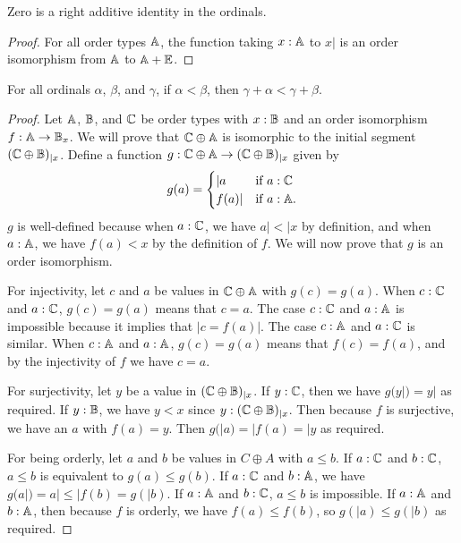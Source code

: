 \documentclass[../../math.tex]{subfiles}
\begin{document}
\begin{instance}
    Zero is a right additive identity in the ordinals.
\end{instance}
\begin{proof}
    For all order types $\mathbb{A}$, the function taking $x : \mathbb{A}$ to $x|$ is an order
    isomorphism from $\mathbb{A}$ to $\mathbb{A} + \mathbb{E}$.
\end{proof}

\begin{theorem} \label{ord_lt_lplus}
    For all ordinals $\alpha$, $\beta$, and $\gamma$, if $\alpha < \beta$, then
    $\gamma + \alpha < \gamma + \beta$.
\end{theorem}
\begin{proof}
    Let $\mathbb{A}$, $\mathbb{B}$, and $\mathbb{C}$ be order types with $x : \mathbb{B}$ and an order
    isomorphism $f : \mathbb{A} \to \mathbb{B}_x$.  We will prove that $\mathbb{C} \oplus \mathbb{A}$ is
    isomorphic to the initial segment $(\mathbb{C} \oplus \mathbb{B})_{|x}$.  Define a function
    $g : \mathbb{C} \oplus \mathbb{A} \to (\mathbb{C} \oplus \mathbb{B})_{|x}$ given by
    \[
        g(a) =
        \begin{cases}
            |a    &\text{if $a : \mathbb{C}$} \\
            f(a)| &\text{if $a : \mathbb{A}$.}
        \end{cases}
    \]
    $g$ is well-defined because when $a : \mathbb{C}$, we have $a| < |x$ by
    definition, and when $a : \mathbb{A}$, we have $f(a) < x$ by the definition of
    $f$.  We will now prove that $g$ is an order isomorphism.

    For injectivity, let $c$ and $a$ be values in $\mathbb{C} \oplus \mathbb{A}$ with $g(c) =
    g(a)$.  When $c : \mathbb{C}$ and $a : \mathbb{C}$, $g(c) = g(a)$ means that $c = a$.  The
    case $c : \mathbb{C}$ and $a : \mathbb{A}$ is impossible because it implies that $|c =
    f(a)|$.  The case $c : \mathbb{A}$ and $a : \mathbb{C}$ is similar.  When $c : \mathbb{A}$ and $a :
    \mathbb{A}$, $g(c) = g(a)$ means that $f(c) = f(a)$, and by the injectivity of $f$
    we have $c = a$.

    For surjectivity, let $y$ be a value in $(\mathbb{C} \oplus \mathbb{B})_{|x}$.  If $y : \mathbb{C}$,
    then we have $g(y|) = y|$ as required.  If $y : \mathbb{B}$, we have $y < x$ since
    $y : (\mathbb{C} \oplus \mathbb{B})_{|x}$.  Then because $f$ is surjective, we have an $a$
    with $f(a) = y$.  Then $g(|a) = |f(a) = |y$ as required.

    For being orderly, let $a$ and $b$ be values in $C \oplus A$ with $a \leq
    b$.  If $a : \mathbb{C}$ and $b : \mathbb{C}$, $a \leq b$ is equivalent to $g(a) \leq g(b)$.
    If $a : \mathbb{C}$ and $b : \mathbb{A}$, we have $g(a|) = a| \leq |f(b) = g(|b)$.  If $a :
    \mathbb{A}$ and $b : \mathbb{C}$, $a \leq b$ is impossible.  If $a : \mathbb{A}$ and $b : \mathbb{A}$, then
    because $f$ is orderly, we have $f(a) \leq f(b)$, so $g(|a) \leq g(|b)$ as
    required.
\end{proof}
\end{document}
